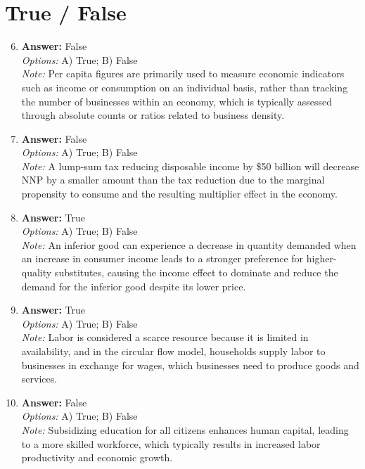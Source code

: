 \documentclass[12pt]{article}
\begin{document}
\section*{True / False}
\begin{enumerate}[label=\arabic*.]
\setcounter{enumi}{5}
\item \textbf{Answer:} False
\\ \textit{Options:} A) True; B) False
\\ \textit{Note:} Per capita figures are primarily used to measure economic indicators such as income or consumption on an individual basis, rather than tracking the number of businesses within an economy, which is typically assessed through absolute counts or ratios related to business density.
\item \textbf{Answer:} False
\\ \textit{Options:} A) True; B) False
\\ \textit{Note:} A lump-sum tax reducing disposable income by \$50 billion will decrease NNP by a smaller amount than the tax reduction due to the marginal propensity to consume and the resulting multiplier effect in the economy.
\item \textbf{Answer:} True
\\ \textit{Options:} A) True; B) False
\\ \textit{Note:} An inferior good can experience a decrease in quantity demanded when an increase in consumer income leads to a stronger preference for higher-quality substitutes, causing the income effect to dominate and reduce the demand for the inferior good despite its lower price.
\item \textbf{Answer:} True
\\ \textit{Options:} A) True; B) False
\\ \textit{Note:} Labor is considered a scarce resource because it is limited in availability, and in the circular flow model, households supply labor to businesses in exchange for wages, which businesses need to produce goods and services.
\item \textbf{Answer:} False
\\ \textit{Options:} A) True; B) False
\\ \textit{Note:} Subsidizing education for all citizens enhances human capital, leading to a more skilled workforce, which typically results in increased labor productivity and economic growth.
\end{enumerate}
\end{document}
